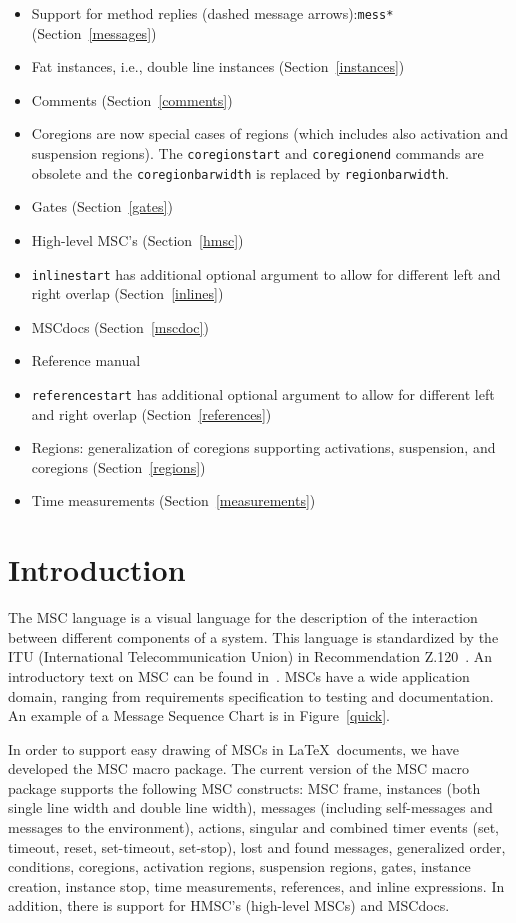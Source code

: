 \documentclass[12pt,a4paper]{article}
\newcommand{\cmd}[1]{\texttt{\bslash #1}}
\newcommand{\acro}[1]{{#1}}
\newcommand{\MSC}{\acro{MSC}}
\newcommand{\HMSC}{\acro{HMSC}}
\newcommand{\MSCdoc}{\MSC{}doc}
\newcommand{\mscpack}{\MSC{} macro package}
\begin{document}
\begin{itemize}
\item Support for method replies (dashed message arrows):\cmd{mess*} (Section~\ref{messages})
\item Fat instances, i.e., double line instances (Section~\ref{instances})
\item Comments (Section~\ref{comments})
\item Coregions are now special cases of regions (which includes also
activation and suspension regions). The \cmd{coregionstart} and
\cmd{coregionend} commands are obsolete and the \cmd{coregionbarwidth}
is replaced by \cmd{regionbarwidth}.
\item Gates (Section~\ref{gates})
\item High-level \MSC{}'s (Section~\ref{hmsc})
\item \cmd{inlinestart} has additional optional argument to allow for different left and right overlap (Section~\ref{inlines})
\item \MSCdoc{}s (Section~\ref{mscdoc})
\item Reference manual~\cite{BM02}
\item \cmd{referencestart} has additional optional argument to allow for different left and right overlap (Section~\ref{references})
\item Regions: generalization of coregions supporting activations, suspension, and coregions (Section~\ref{regions})
\item Time measurements (Section~\ref{measurements})
\end{itemize}


\section{Introduction}
\label{introduction}

The \MSC{} language is a visual language for the description of the
interaction between different components of a system.
This language is standardized by the ITU (International
Telecommunication Union) in Recommendation Z.120~\cite{z120}. An
introductory text on \MSC{} can be found
in~\cite{RudolphGrabowskiGraubmann96}. \MSC{}s have a
wide application domain, ranging from requirements specification to
testing and documentation.
An example of a Message Sequence Chart is in Figure~\ref{quick}.

In order to support easy drawing of \MSC{}s in \LaTeX\ documents, we have
developed the \mscpack.  The current version of the \mscpack{}
supports the following \MSC{} constructs: \MSC{} frame, instances (both
single line width and double line width), messages (including
self-messages and messages to the environment), actions, singular and
combined timer events (set, timeout, reset, set-timeout, set-stop),
lost and found messages, generalized order, conditions, coregions,
activation regions, suspension regions, gates, instance creation,
instance stop, time measurements, references, and inline
expressions. In addition, there is support for \HMSC{}'s (high-level
\MSC{}s) and \MSCdoc{}s.
\end{document}
